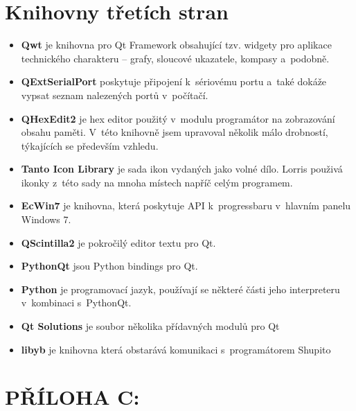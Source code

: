 \documentclass[12pt, a4paper, oneside]{article}
\begin{document}
\section*{Knihovny třetích stran}
\begin{itemize}
    \item {\bf Qwt}\cite{qwt} je knihovna pro Qt Framework obsahující tzv. widgety pro aplikace technického charakteru -- grafy, sloucové ukazatele, kompasy a~podobně.
    \item {\bf QExtSerialPort}\cite{qext} poskytuje připojení k~sériovému portu a~také dokáže vypsat seznam nalezených portů v~počítačí.
    \item {\bf QHexEdit2}\cite{qhex} je hex editor použitý v~modulu programátor na zobrazování obsahu paměti. V~této knihovně jsem upravoval několik málo drobností, týkajících se především vzhledu.
    \item {\bf Tanto Icon Library}\cite{tango} je sada ikon vydaných jako volné dílo. Lorris použivá ikonky z~této sady na mnoha místech napříč celým programem.
    \item {\bf EcWin7}\cite{ecwin7} je knihovna, která poskytuje API k~progressbaru v~hlavním panelu Windows 7.
    \item {\bf QScintilla2}\cite{qsci} je pokročilý editor textu pro Qt.
    \item {\bf PythonQt}\cite{pythonqt} jsou Python bindings pro Qt.
    \item {\bf Python}\cite{python} je programovací jazyk, používají se některé části jeho interpreteru v~kombinaci s~PythonQt.
    \item {\bf Qt Solutions}\cite{qtsolutions} je soubor několika přídavných modulů pro Qt
    \item {\bf libyb}\cite{libyb} je knihovna která obstarává komunikaci s~programátorem Shupito
\end{itemize}

\section*{PŘÍLOHA C:}
\end{document}
